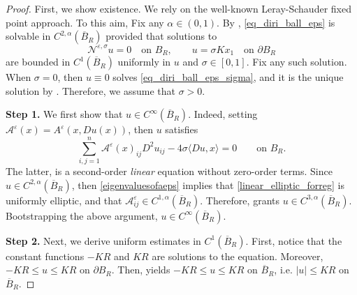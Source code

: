 \documentclass[11pt]{amsart}
\renewcommand{\leq}{\leqslant}
\renewcommand{\ge}{>}
\newcommand{\eps}{\varepsilon}
\newcommand{\Nes}{\mathcal N^{\eps,\sigma}}
\newcommand{\Ae}{A^\eps}
\theoremstyle{definition}
\theoremstyle{remark}
\numberwithin{equation}{section}
\begin{document}
\begin{proof}
    First, we show existence. We rely on the well-known Leray-Schauder fixed point approach. To this aim, 
    Fix any $\alpha\in(0,1)$. By \cite[Theorem 13.8]{MR1814364}, \eqref{eq_diri_ball_eps} is solvable in $C^{2,\alpha}(\overline B_R)$ provided that solutions to 
    \begin{equation}\label{eq_diri_ball_eps_sigma}
 \Nes u=0\quad\text{on }B_R,
 \qquad u=\sigma Kx_1\quad\text{on }\partial B_R
\end{equation}
are bounded in $C^1(\overline B_R)$ uniformly in $u$ and $\sigma\in[0,1]$. Fix any such solution. When $\sigma=0$, then $u\equiv 0$ solves \eqref{eq_diri_ball_eps_sigma}, and it is the unique solution by . Therefore, we assume that $\sigma\ge 0$. 

\smallskip
\noindent \textbf{Step 1.} We first show that $u\in C^\infty(\overline B_R)$. Indeed, setting $\mathcal A^\eps(x)=\Ae(x,Du(x))$, then $u$ satisfies 
\begin{equation}\label{linear_elliptic_forreg}
\sum_{i,j=1}^n\mathcal A^\eps(x)_{ij}D^2 u_{ij}-4\sigma \langle Du,x\rangle=0\qquad \text{on $B_R$.}
\end{equation}
The latter, is a second-order \emph{linear} equation without zero-order terms. Since $u\in C^{2,\alpha}(\overline B_R)$, then \eqref{eigenvaluesofaeps} implies that \eqref{linear_elliptic_forreg} is uniformly elliptic, and that $\mathcal A^\eps_{ij}\in C^{1,\alpha}(\overline B_R)$. Therefore, \cite[Theorem 6.19]{MR1814364} grants $u\in C^{3,\alpha}(\overline B_R)$. Bootstrapping the above argument, $u\in C^\infty(\overline B_R).$

\smallskip
\noindent \textbf{Step 2.} Next, we derive uniform estimates in $C^1(\overline B_R)$. First, notice that the constant functions $-KR$ and $KR$ are solutions to the equation. Moreover, $-KR\leq u\leq KR$ on $\partial B_R.$ Then,  yields $-KR\leq u\leq KR$ on $\overline B_R$, i.e. $|u|\leq KR$ on $\overline B_R$. 


\end{proof}
\end{document}
